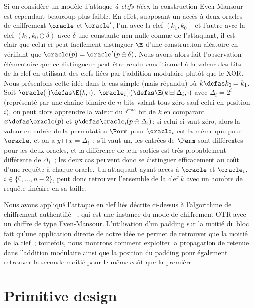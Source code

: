 Si on considère un modèle d'attaque \emph{à clefs liées}, la construction Even-Mansour est cependant beaucoup plus faible. En effet, supposant un accès à deux oracles de chiffrement
$\oracle$ et $\oracle'$, l'un avec la clef $(k_1,k_0)$ et l'autre avec la clef $(k_1,k_0\oplus\delta)$ avec $\delta$ une constante non nulle connue de l'attaquant,
il est clair que celui-ci peut facilement distinguer $\E$ d'une construction aléatoire en vérifiant que $\oracle(p) = \oracle'(p \oplus \delta)$.
Nous avons alors fait l'observation élémentaire que ce distingueur peut-être rendu conditionnel à la valeur des bits de la clef en utilisant des clefs liées par l'addition
modulaire plutôt que le XOR. Nous présentons cette idée dans le cas simple (mais répandu) où $k \defas k_0 = k_1$. Soit $\oracle(\cdot) \defas \E(k, \cdot)$, $\oracle_i(\cdot)
\defas \E(k \boxplus \Delta_i,\cdot)$ avec $\Delta_i = 2^i$ (représenté par une chaîne binaire de $n$ bits valant tous zéro sauf celui en position $i$), on peut alors
apprendre la valeur du $i^\text{ème}$ bit de $k$ en comparant $x \defas \oracle(p)$ et $y \defas \oracle_i(p \oplus \Delta_i)$: si celui-ci vaut zéro, alors la valeur
en entrée de la permutation $\Perm$ pour $\oracle_i$ est la même que pour $\oracle$, et on a $y \boxminus x = \Delta_i$~; s'il vaut un, les entrées de $\Perm$ sont différentes
pour les deux oracles, et la différence de leur sorties est très probablement différente de $\Delta_i$~; les deux cas peuvent donc se distinguer efficacement au coût
d'une requête à chaque oracle. Un attaquant ayant accès à $\oracle$ et $\oracle_i$, $i \in \{0,\ldots,n - 2\}$, peut donc retrouver l'ensemble de la clef $k$ 
avec un nombre de requête linéaire en sa taille. 

Nous avons appliqué l'attaque en clef liée décrite ci-dessus à l'algorithme de chiffrement authentifié \proestotr~\cite{proest}, qui est une instance du mode de chiffrement
OTR avec un chiffre de type Even-Mansour.  L'utilisation d'un padding sur la moitié du bloc fait qu'une application directe de notre idée ne permet de retrouver que la moitié
de la clef~; toutefois, nous montrons comment exploiter la propagation de retenue dans l'addition modulaire ainsi que la position du padding pour également retrouver la seconde moitié pour le même coût que la première.

\section[Conception de primitives]{Primitive design}

